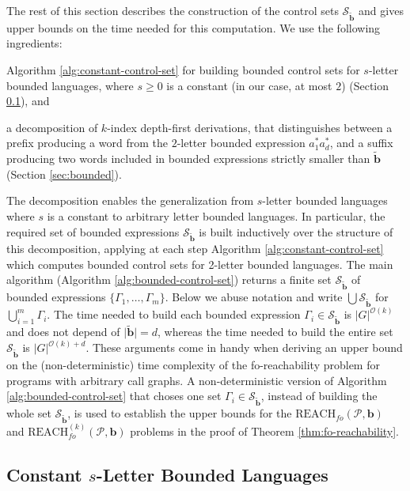 \documentclass[final]{llncs}
\def\len#1{{\vert{#1}\vert}}
\def\pat{{\mathbf{b}}}
\def\patt{{\widetilde{\mathbf{b}}}}
\def\foreach{\mathrm{REACH}_{\mathit{fo}}}
\begin{document}
The rest of this section describes the construction of the control
sets \(\mathcal{S}_\patt\) and gives upper bounds on the time needed
for this computation. We use the following ingredients:
\begin{inparaenum} 
\item Algorithm \ref{alg:constant-control-set} for building 
bounded control sets for $s$-letter bounded languages, where $s\geq0$ is a constant 
(in our case, at most $2$) (Section \ref{sec:constant-control-set}), and
\item a decomposition of $k$-index depth-first derivations, that 
distinguishes between a prefix producing a word from the \(2\)-letter
bounded expression $a_1^*a_d^*$, and a suffix producing two words
included in bounded expressions strictly smaller than \(\patt\)
(Section \ref{sec:bounded}). 
\end{inparaenum}
The decomposition enables the generalization from \(s\)-letter bounded
languages where \(s\) is a constant to arbitrary letter bounded
languages. In particular, the required set of bounded
expressions \(\mathcal{S}_\patt\) is built inductively over the
structure of this decomposition, applying at each step
Algorithm \ref{alg:constant-control-set} which computes bounded
control sets for 2-letter bounded languages. The main algorithm
(Algorithm \ref{alg:bounded-control-set}) returns a finite
set \(\mathcal{S}_\patt\) of bounded expressions
$\{\Gamma_1, \ldots, \Gamma_m\}$. Below we abuse notation and
write \(\bigcup\mathcal{S}_\patt\)
for \(\bigcup_{i=1}^m \Gamma_i \). The time needed to build each
bounded expression $\Gamma_i \in \mathcal{S}_\patt$ is
$\len{G}^{\mathcal{O}(k)}$ and does not depend of $\len{\patt}=d$,
whereas the time needed to build the entire set \(\mathcal{S}_\patt\)
is \(\len{G}^{\mathcal{O}(k)+d}\). These arguments come in handy when
deriving an upper bound on the (non-deterministic) time complexity of
the fo-reachability problem for programs with arbitrary call graphs.
A non-deterministic version of Algorithm \ref{alg:bounded-control-set}
that choses one set \(\Gamma_i\in\mathcal{S}_\patt\), instead of
building the whole set \(\mathcal{S}_\patt\), is used to establish the
upper bounds for the \(\foreach(\mathcal{P}, \pat)\)
and \(\foreach^{(k)}(\mathcal{P}, \pat)\) problems in the proof of
Theorem \ref{thm:fo-reachability}.

\subsection{Constant $s$-Letter Bounded Languages}\label{sec:constant-control-set}
\end{document}
